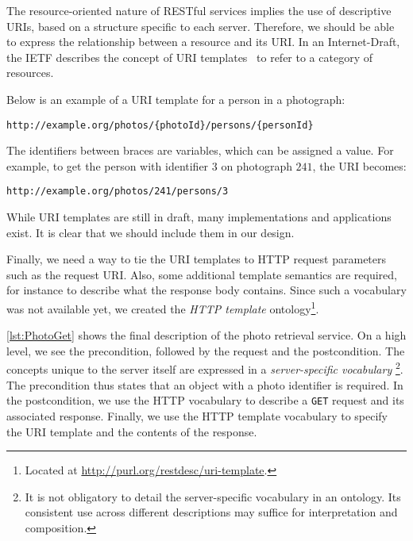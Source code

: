 \documentclass[runningheads,a4paper, twocolumn]{llncs}
\begin{document}
The resource-oriented nature of RESTful services implies the use of descriptive URIs, based on a structure specific to each server. Therefore, we should be able to express the relationship between a resource and its URI. In an Internet-Draft, the IETF describes the concept of URI templates~\cite{URITemplate} to refer to a category of resources.

\needspace{2em} Below is an example of a URI template for a person in a photograph:
\begin{Verbatim}
http://example.org/photos/{photoId}/persons/{personId}
\end{Verbatim}
The identifiers between braces are variables, which can be assigned a value. For example, to get the person with identifier $3$ on photograph $241$, the URI becomes:
\begin{Verbatim}
http://example.org/photos/241/persons/3
\end{Verbatim}

While URI templates are still in draft, many implementations and applications exist. It is clear that we should include them in our design.

Finally, we need a way to tie the URI templates to HTTP request parameters such as the request URI. Also, some additional template semantics are required, for instance to describe what the response body contains. Since such a vocabulary was not available yet, we created the \emph{HTTP template} ontology\footnote{Located at {\fontsize{8}{10}\url{http://purl.org/restdesc/uri-template}}.}.

\autoref{lst:PhotoGet} shows the final description of the photo retrieval service. On a high level, we see the precondition, followed by the request and the postcondition. The concepts unique to the server itself are expressed in a \emph{server-specific vocabulary}
\footnote{It is not obligatory to detail the server-specific vocabulary in an ontology. Its consistent use across different descriptions may suffice for interpretation and composition.}.
The precondition thus states that an object with a photo identifier is required. In the postcondition, we use the HTTP vocabulary to describe a \Verb!GET! request and its associated response. Finally, we use the HTTP template vocabulary to specify the URI template and the contents of the response.
\end{document}
